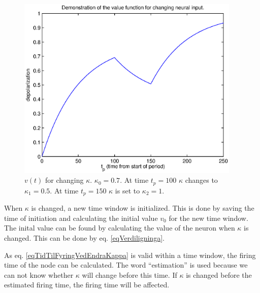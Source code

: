 \begin{figure}[hbt!p]
	\centering
	\includegraphics[width=0.95\textwidth]{demonstrasjonAvUlikeKappaforVerdifunksjonen}
	\caption{$v(t)$ for changing $\kappa$. $\kappa_0=0.7$. At time $t_p=100$ $\kappa$ changes to $\kappa_1=0.5$. 
			At time $t_p=150$ $\kappa$ is set to $\kappa_2=1$.}
	\label{figVerdifunksjonen}
\end{figure}


When $\kappa$ is changed, a new time window is initialized.
This is done by saving the time of initiation and calculating the initial value $v_0$ for the new time window.
The inital value can be found by calculating the value of the neuron when $\kappa$ is changed.
This can be done by eq. \eqref{eqVerdiligninga}.

As eq.  \eqref{eqTidTilFyringVedEndraKappa} is valid within a time window, the firing time of the node can be calculated. 
The word ``estimation'' is used because we can not know whether $\kappa$ will change before this time.
If $\kappa$ is changed before the estimated firing time, the firing time will be affected. 





